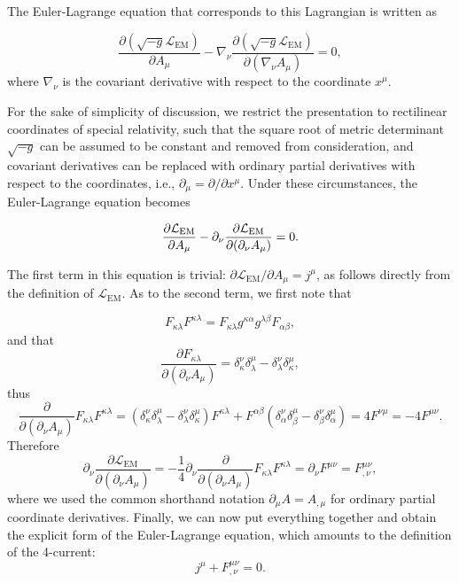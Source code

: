\documentclass[twoside,reqno,11pt]{amsart}
\theoremstyle{definition}
\theoremstyle{remark}
\numberwithin{equation}{section}
\begin{document}
The Euler-Lagrange equation that corresponds to this Lagrangian is written as

\begin{equation}
\frac{\partial(\sqrt{-g}\mathcal{L}_\mathrm{ EM})}{\partial A_\mu}-\nabla_\nu\frac{\partial(\sqrt{-g}\mathcal{L}_\mathrm{EM})}{\partial(\nabla_\nu A_\mu)}=0,
\label{eq:MaxLag}
\end{equation}
where $\nabla_\nu$ is the covariant derivative with respect to the coordinate $x^\mu$.

For the sake of simplicity of discussion, we restrict the presentation to rectilinear coordinates of special relativity, such that the square root of metric determinant $\sqrt{-g}$ can be assumed to be constant and removed from consideration, and covariant derivatives can be replaced with ordinary partial derivatives with respect to the coordinates, i.e., $\partial_\mu=\partial/\partial x^\mu$. Under these circumstances, the Euler-Lagrange equation becomes

\begin{equation}
\frac{\partial \mathcal{L}_\mathrm{EM}}{\partial A_\mu}-\partial_\nu\frac{\partial\mathcal{ L}_{\rm EM}}{\partial(\partial_\nu A_\mu)}=0.
\end{equation}

The first term in this equation is trivial: $\partial\mathcal{L}_\mathrm{ EM}/\partial A_\mu=j^\mu$, as follows directly from the definition of $\mathcal{ L}_\mathrm{ EM}$. As to the second term, we first note that

\[
F_{\kappa\lambda}F^{\kappa\lambda}=F_{\kappa\lambda}g^{\kappa\alpha}g^{\lambda\beta}F_{\alpha\beta},
\]
and that
\[
\frac{\partial F_{\kappa\lambda}}{\partial(\partial_\nu A_\mu)}=\delta^\nu_\kappa\delta^\mu_\lambda-\delta^\nu_\lambda\delta^\mu_\kappa,
\]
thus
\begin{equation}
\frac{\partial}{\partial(\partial_\nu A_\mu)}F_{\kappa\lambda}F^{\kappa\lambda}=(\delta^\nu_\kappa\delta^\mu_\lambda-\delta^\nu_\lambda\delta^\mu_\kappa)F^{\kappa\lambda}+
 F^{\alpha\beta}(\delta^\nu_\alpha\delta^\mu_\beta-\delta^\nu_\beta\delta^\mu_\alpha)=4F^{\nu\mu}=-4F^{\mu\nu}.
\end{equation}
Therefore
\begin{equation}
\partial_\nu\frac{\partial\mathcal{L}_\mathrm{ EM}}{\partial(\partial_\nu A_\mu)}=-\frac{1}{4}\partial_\nu\frac{\partial}{\partial(\partial_\nu A_\mu)}F_{\kappa\lambda}F^{\kappa\lambda}=\partial_\nu F^{\mu\nu}=F^{\mu\nu}_{,\nu},
\end{equation}
where we used the common shorthand notation $\partial_\mu A=A_{,\mu}$ for ordinary partial coordinate derivatives. Finally, we can now put everything together and obtain the explicit form of the Euler-Lagrange equation, which amounts to the definition of the 4-current:
\begin{equation}\label{eq:MaxTens}
 j^\mu+F^{\mu\nu}_{,\nu}=0.
\end{equation}
\end{document}
